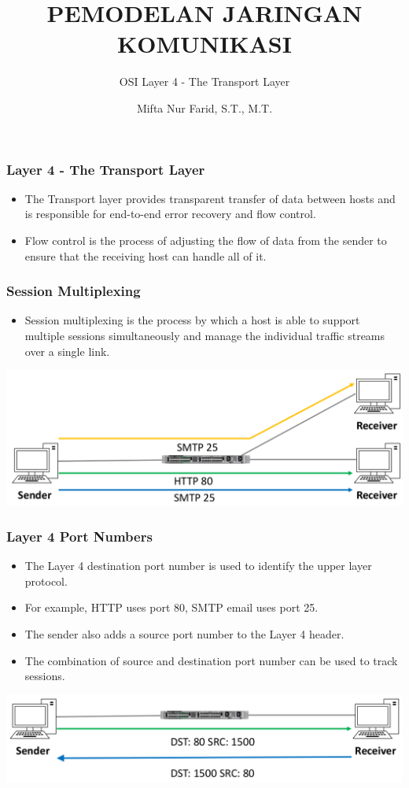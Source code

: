 \documentclass[pdflatex,compress]{beamer}
\title{PEMODELAN JARINGAN KOMUNIKASI}
\subtitle{OSI Layer 4 - The Transport Layer}
\author{Mifta Nur Farid, S.T., M.T.}
\begin{document}
\maketitle

\begin{frame}
	\frametitle{Layer 4 - The Transport Layer}
	\begin{itemize}
		\item The Transport layer provides transparent transfer of data between hosts and is responsible for end-to-end error recovery and flow control.
		\item Flow control is the process of adjusting the flow of data from the sender to ensure that the receiving host can handle all of it.
	\end{itemize}
\end{frame}

\begin{frame}
	\frametitle{Session Multiplexing}
	\begin{itemize}
		\item Session multiplexing is the process by which a host is able to support multiple sessions simultaneously and manage the individual traffic streams over a single link.
	\end{itemize}
	\begin{center}
		\includegraphics[width=\linewidth]{img/img01}
	\end{center}
\end{frame}

\begin{frame}
	\frametitle{Layer 4 Port Numbers}
	\begin{itemize}
		\item The Layer 4 destination port number is used to identify the upper layer protocol.
		\item For example, HTTP uses port 80, SMTP email uses port 25.
		\item The sender also adds a source port number to the Layer 4 header.
		\item The combination of source and destination port number can be used to track sessions.
	\end{itemize}
	\begin{center}
		\includegraphics[width=\linewidth]{img/img02}
	\end{center}
\end{frame}
\end{document}
